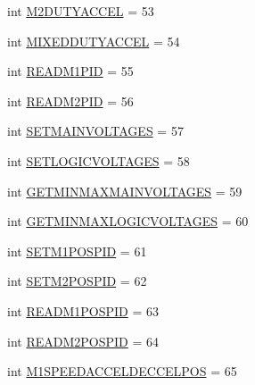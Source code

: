 \begin{DoxyCompactItemize}
\item 
int \mbox{\hyperlink{classtoxic__hardware_1_1roboclaw__3_1_1Roboclaw_1_1Cmd_a26c30122cd101df2bfc3828abca02321}{M2\+D\+U\+T\+Y\+A\+C\+C\+EL}} = 53
\item 
int \mbox{\hyperlink{classtoxic__hardware_1_1roboclaw__3_1_1Roboclaw_1_1Cmd_afc21bdf344e4624d0cf8af64c242856d}{M\+I\+X\+E\+D\+D\+U\+T\+Y\+A\+C\+C\+EL}} = 54
\item 
int \mbox{\hyperlink{classtoxic__hardware_1_1roboclaw__3_1_1Roboclaw_1_1Cmd_ad37f51c814f42ebeb2897946aa40934d}{R\+E\+A\+D\+M1\+P\+ID}} = 55
\item 
int \mbox{\hyperlink{classtoxic__hardware_1_1roboclaw__3_1_1Roboclaw_1_1Cmd_af7c3d55807969c8bb77f109f7fed9565}{R\+E\+A\+D\+M2\+P\+ID}} = 56
\item 
int \mbox{\hyperlink{classtoxic__hardware_1_1roboclaw__3_1_1Roboclaw_1_1Cmd_a5fc32f67adce5811e9197da7669ae9bd}{S\+E\+T\+M\+A\+I\+N\+V\+O\+L\+T\+A\+G\+ES}} = 57
\item 
int \mbox{\hyperlink{classtoxic__hardware_1_1roboclaw__3_1_1Roboclaw_1_1Cmd_a9ba5e049493cb95e4ad4a40e7abe4d65}{S\+E\+T\+L\+O\+G\+I\+C\+V\+O\+L\+T\+A\+G\+ES}} = 58
\item 
int \mbox{\hyperlink{classtoxic__hardware_1_1roboclaw__3_1_1Roboclaw_1_1Cmd_acf094176a10541af4d3eb26ed8b02ac9}{G\+E\+T\+M\+I\+N\+M\+A\+X\+M\+A\+I\+N\+V\+O\+L\+T\+A\+G\+ES}} = 59
\item 
int \mbox{\hyperlink{classtoxic__hardware_1_1roboclaw__3_1_1Roboclaw_1_1Cmd_acee20af4cd21268058cc614ec920acd6}{G\+E\+T\+M\+I\+N\+M\+A\+X\+L\+O\+G\+I\+C\+V\+O\+L\+T\+A\+G\+ES}} = 60
\item 
int \mbox{\hyperlink{classtoxic__hardware_1_1roboclaw__3_1_1Roboclaw_1_1Cmd_a358969d7999acc0329ecab8eb8b37394}{S\+E\+T\+M1\+P\+O\+S\+P\+ID}} = 61
\item 
int \mbox{\hyperlink{classtoxic__hardware_1_1roboclaw__3_1_1Roboclaw_1_1Cmd_ab96dbc6e64094c8ce89c6d953f05f942}{S\+E\+T\+M2\+P\+O\+S\+P\+ID}} = 62
\item 
int \mbox{\hyperlink{classtoxic__hardware_1_1roboclaw__3_1_1Roboclaw_1_1Cmd_aef5b53ff0919981f54bc6a19ad5037a7}{R\+E\+A\+D\+M1\+P\+O\+S\+P\+ID}} = 63
\item 
int \mbox{\hyperlink{classtoxic__hardware_1_1roboclaw__3_1_1Roboclaw_1_1Cmd_a7f3e71069d5d9059a090be6002c373d8}{R\+E\+A\+D\+M2\+P\+O\+S\+P\+ID}} = 64
\item 
int \mbox{\hyperlink{classtoxic__hardware_1_1roboclaw__3_1_1Roboclaw_1_1Cmd_acbfff02a950cd496f90acb61d41f06a5}{M1\+S\+P\+E\+E\+D\+A\+C\+C\+E\+L\+D\+E\+C\+C\+E\+L\+P\+OS}} = 65

\end{DoxyCompactItemize}
